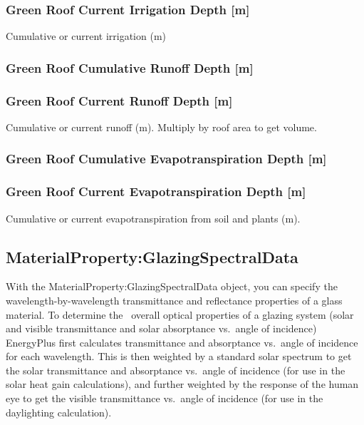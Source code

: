 \subsubsection{Green Roof Current Irrigation Depth {[}m{]}}\label{green-roof-current-irrigation-depth-m}

Cumulative or current irrigation (m)

\subsubsection{Green Roof Cumulative Runoff Depth {[}m{]}}\label{green-roof-cumulative-runoff-depth-m}

\subsubsection{Green Roof Current Runoff Depth {[}m{]}}\label{green-roof-current-runoff-depth-m}

Cumulative or current runoff (m). Multiply by roof area to get volume.

\subsubsection{Green Roof Cumulative Evapotranspiration Depth {[}m{]}}\label{green-roof-cumulative-evapotranspiration-depth-m}

\subsubsection{Green Roof Current Evapotranspiration Depth {[}m{]}}\label{green-roof-current-evapotranspiration-depth-m}

Cumulative or current evapotranspiration from soil and plants (m).

\subsection{MaterialProperty:GlazingSpectralData}\label{materialpropertyglazingspectraldata}

With the MaterialProperty:GlazingSpectralData object, you can specify the wavelength-by-wavelength transmittance and reflectance properties of a glass material. To determine the~ overall optical properties of a glazing system (solar and visible transmittance and solar absorptance vs.~angle of incidence) EnergyPlus first calculates transmittance and absorptance vs.~angle of incidence for each wavelength. This is then weighted by a standard solar spectrum to get the solar transmittance and absorptance vs.~angle of incidence (for use in the solar heat gain calculations), and further weighted by the response of the human eye to get the visible transmittance vs.~angle of incidence (for use in the daylighting calculation).

